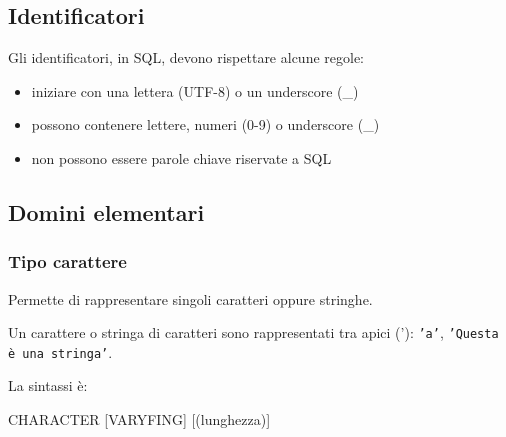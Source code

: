 \subsection{Identificatori}

Gli identificatori, in SQL, devono rispettare alcune regole:
\begin{itemize}[label=$\diamond$, itemsep=\smallskipamount]
  \item iniziare con una lettera (UTF-8) o un underscore (\_)
  \item possono contenere lettere, numeri (0-9) o underscore (\_)
  \item non possono essere parole chiave riservate a SQL
\end{itemize}


\subsection{Domini elementari}

\subsubsection{Tipo carattere}
Permette di rappresentare singoli caratteri oppure stringhe.

Un carattere o stringa di caratteri sono rappresentati tra apici ('):
\texttt{'a'}, \texttt{'Questa è una stringa'}.

La sintassi è:
\begin{codiceSQL}
CHARACTER [VARYFING] [(lunghezza)]
\end{codiceSQL}

